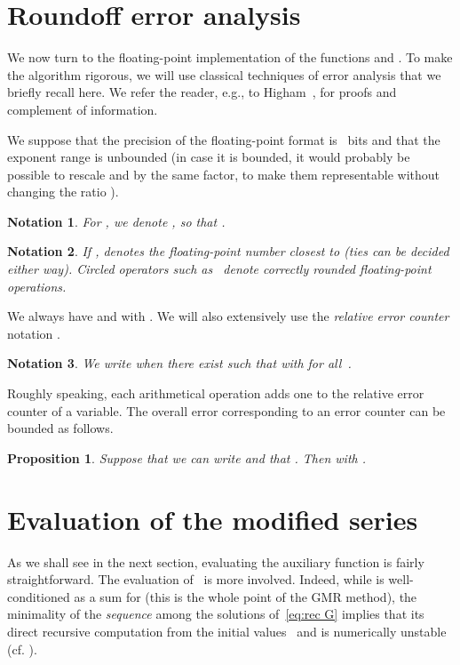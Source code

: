 \documentclass[10pt, conference]{IEEEtran}
\newtheorem{notation}{Notation}
\newtheorem{proposition}{Proposition}
\begin{document}
\section{Roundoff error analysis}
\label{sec:roundoff Analysis}

We now turn to the floating-point implementation of the functions  and .
To make the algorithm rigorous, we will use classical techniques of error analysis that we briefly recall here.
We refer the reader, e.g., to Higham~\cite{Higham}, for proofs and complement of information.

We suppose that the precision of the floating-point format is ~bits and that the exponent range is unbounded (in case it is bounded, it would probably be possible to rescale  and  by the same factor, to make them representable without changing the ratio ).


\begin{notation}
  \label{not:EXP}
  For , we denote , so that .
\end{notation}

\begin{notation}
  \label{not:Circ}
    If ,  denotes the floating-point number closest to  (ties can be decided either way).
  Circled operators such as~ denote correctly rounded floating-point operations.
\end{notation}

We always  have  and  with .
We will also extensively use the \emph{relative error counter} notation .

\begin{notation}
We write  when there exist  such that  with  for all~.
\end{notation}

Roughly speaking, each arithmetical operation adds one to the relative error counter of a variable. The overall error corresponding to an error counter can  be bounded as follows.

\begin{proposition}
\label{errorsAccumulation}
  Suppose that we can write  and that . Then  with .
\end{proposition}

\section{Evaluation of the modified series}

As we shall see in the next section, evaluating the auxiliary function  is fairly straightforward.
The evaluation of~ is more involved.
Indeed, while  is well-conditioned as a sum for  (this is the whole point of the GMR method), the minimality of the \emph{sequence}  among the solutions of~\eqref{eq:rec G} implies that its direct recursive computation from the initial values~ and  is numerically unstable (cf. \cite{Wimp1984}).
\end{document}
